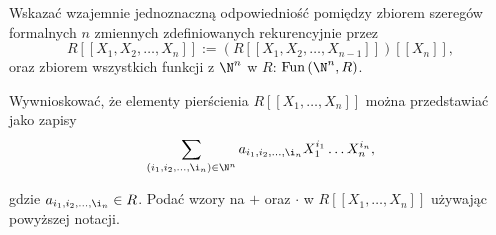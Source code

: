 \begin{problem}[3]
	Wskazać wzajemnie jednoznaczną odpowiedniość pomiędzy zbiorem szeregów formalnych $n$ zmiennych zdefiniowanych rekurencyjnie przez \[
	R\left[ \left[ X_1,X_2,\ldots,X_{n}  \right]  \right] := \left( R\left[\left[ X_1,X_2,\ldots,X_{n-1} \right]\right]  \right)\left[ \left[ X_{n}  \right]  \right] 
	,\] 
	oraz zbiorem wszystkich funkcji z $\N^{n}$ w $R$:  $\text{Fun}\left( \N^{n}, R \right) $.

	Wywnioskować, że elementy pierścienia $R\left[ \left[ X_1,\ldots,X_{n} \right]  \right] $ można przedstawiać jako zapisy
	\[
	\sum_{\left( i_1,i_2,\ldots,\i_{n}  \right) \in \N^{n}} a_{i_1,i_2,\ldots,\i_{n} }X_{1}^{i_1}\ldots X_{n}^{i_{n}}
	,\] 

	gdzie $a_{i_1,i_2,\ldots,\i_{n} }\in R$. Podać wzory na $+$ oraz $\cdot $ w $R\left[ \left[ X_1,\ldots,X_{n}  \right]  \right] $ używając powyższej notacji.
\end{problem} 
